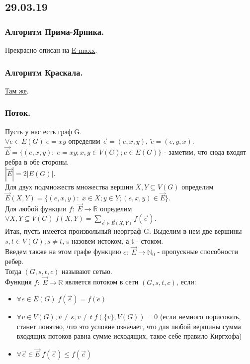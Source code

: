 \subsection{29.03.19}
\subsubsection{Алгоритм Прима-Ярника.}
Прекрасно описан на \href{http://www.e-maxx-ru.1gb.ru/algo/mst_prim}{E-maxx}.
\subsubsection{Алгоритм Краскала.}
\href{http://www.e-maxx-ru.1gb.ru/algo/mst_kruskal}{Там же}.
\subsubsection{Поток.}
Пусть у нас есть граф G.\\
$\forall e \in E(G) \; e = xy$ определим $\overrightarrow{e} = (e, x, y), \; \overleftarrow{e} = (e, y, x)$.\\
$\overrightarrow{E} = \{(e, x, y): \; e = xy; x, y \in V(G); e \in E(G)\}$ - заметим, что сюда входят ребра в обе стороны.\\
$|\overrightarrow{E}| = 2|E(G)|$.\\
Для двух подмножеств множества вершин $X, Y \subseteq V(G)$ определим $\overrightarrow{E}(X, Y) = \{(e, x, y): \; x \in X; y \in Y; (e, x, y) \in \overrightarrow{E}\}$.\\
Для любой функции $f: \; \overrightarrow{E} \rightarrow \mathbb{R}$ определим $\forall X, Y \subseteq V(G) \; f(X, Y) = \sum\limits_{\overrightarrow{e} \in \overrightarrow{E}(X, Y)}f(\overrightarrow{e})$.\\
Итак, пусть имеется произвольный неорграф G. Выделим в нем две вершины $s, t \in V(G); s \not= t$, s назовем истоком, а t - стоком.\\
Введем также на этом графе функцию $c: \; \overrightarrow{E} \rightarrow \mathbb{N}_0$ - пропускные способности ребер.\\
Тогда $(G, s, t, c)$ называют сетью.\\
Функция $f: \; \overrightarrow{E} \rightarrow \mathbb{R}$ является потоком в сети $(G, s, t, c)$, если:\\
\begin{itemize}
\item $\forall e \in E(G) \; f(\overrightarrow{e}) = f(\overleftarrow{e})$ \\
\item $\forall v \in V(G), v \not= s, v \not= t \; f(\{v\}, V(G)) = 0$ (если немного порисовать, станет понятно, что это условие означает, что для любой вершины сумма входящих потоков равна сумме исходящих, такое себе правило Киргхофа)\\
\item $\forall \overrightarrow{e} \in \overrightarrow{E} \; f(\overrightarrow{e}) \leq f(\overrightarrow{e})$
\end{itemize}
